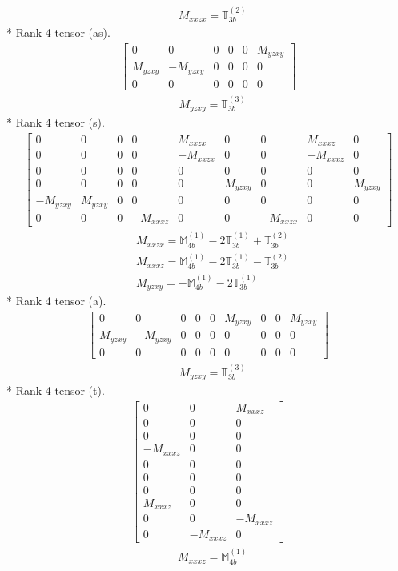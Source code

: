 \documentclass[fleqn,8pt,landscape]{jsarticle}
\begin{document}
\begin{align*}
& M_{xxzx} = \mathbb{T}_{3b}^{(2)}
\end{align*}
* Rank 4 tensor (as).
\begin{align*}
\begin{bmatrix} 0 & 0 & 0 & 0 & 0 & M_{yzxy} \\ M_{yzxy} & - M_{yzxy} & 0 & 0 & 0 & 0 \\ 0 & 0 & 0 & 0 & 0 & 0 \end{bmatrix}
\end{align*}
\begin{align*}
& M_{yzxy} = \mathbb{T}_{3b}^{(3)}
\end{align*}
* Rank 4 tensor (s).
\begin{align*}
\begin{bmatrix} 0 & 0 & 0 & 0 & M_{xxzx} & 0 & 0 & M_{xxxz} & 0 \\ 0 & 0 & 0 & 0 & - M_{xxzx} & 0 & 0 & - M_{xxxz} & 0 \\ 0 & 0 & 0 & 0 & 0 & 0 & 0 & 0 & 0 \\ 0 & 0 & 0 & 0 & 0 & M_{yzxy} & 0 & 0 & M_{yzxy} \\ - M_{yzxy} & M_{yzxy} & 0 & 0 & 0 & 0 & 0 & 0 & 0 \\ 0 & 0 & 0 & - M_{xxxz} & 0 & 0 & - M_{xxzx} & 0 & 0 \end{bmatrix}
\end{align*}
\begin{align*}
& M_{xxzx} = \mathbb{M}_{4b}^{(1)} - 2 \mathbb{T}_{3b}^{(1)} + \mathbb{T}_{3b}^{(2)} \\
& M_{xxxz} = \mathbb{M}_{4b}^{(1)} - 2 \mathbb{T}_{3b}^{(1)} - \mathbb{T}_{3b}^{(2)} \\
& M_{yzxy} = - \mathbb{M}_{4b}^{(1)} - 2 \mathbb{T}_{3b}^{(1)}
\end{align*}
* Rank 4 tensor (a).
\begin{align*}
\begin{bmatrix} 0 & 0 & 0 & 0 & 0 & M_{yzxy} & 0 & 0 & M_{yzxy} \\ M_{yzxy} & - M_{yzxy} & 0 & 0 & 0 & 0 & 0 & 0 & 0 \\ 0 & 0 & 0 & 0 & 0 & 0 & 0 & 0 & 0 \end{bmatrix}
\end{align*}
\begin{align*}
& M_{yzxy} = \mathbb{T}_{3b}^{(3)}
\end{align*}
* Rank 4 tensor (t).
\begin{align*}
\begin{bmatrix} 0 & 0 & M_{xxxz} \\ 0 & 0 & 0 \\ 0 & 0 & 0 \\ - M_{xxxz} & 0 & 0 \\ 0 & 0 & 0 \\ 0 & 0 & 0 \\ 0 & 0 & 0 \\ M_{xxxz} & 0 & 0 \\ 0 & 0 & - M_{xxxz} \\ 0 & - M_{xxxz} & 0 \end{bmatrix}
\end{align*}
\begin{align*}
& M_{xxxz} = \mathbb{M}_{4b}^{(1)}
\end{align*}
\end{document}

